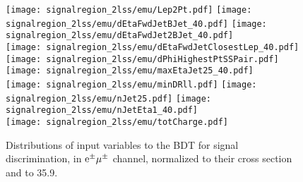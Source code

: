 \begin{figure} [!h]
  \centering
  \texttt{[image: signalregion\_2lss/emu/Lep2Pt.pdf]}
  \texttt{[image: signalregion\_2lss/emu/dEtaFwdJetBJet\_40.pdf]}
  \texttt{[image: signalregion\_2lss/emu/dEtaFwdJet2BJet\_40.pdf]}\\
  \texttt{[image: signalregion\_2lss/emu/dEtaFwdJetClosestLep\_40.pdf]} 
  \texttt{[image: signalregion\_2lss/emu/dPhiHighestPtSSPair.pdf]}
  \texttt{[image: signalregion\_2lss/emu/maxEtaJet25\_40.pdf]}\\
  \texttt{[image: signalregion\_2lss/emu/minDRll.pdf]}
  \texttt{[image: signalregion\_2lss/emu/nJet25.pdf]} 
  \texttt{[image: signalregion\_2lss/emu/nJetEta1\_40.pdf]}\\
  \texttt{[image: signalregion\_2lss/emu/totCharge.pdf]}
  \caption[Input variables to the BDT, $2lss-\emu$ channel]{Distributions of input variables to the BDT for signal discrimination, in $\textrm{e}^\pm\mu^\pm$ channel, normalized to their cross section and to 35.9\fbinv.}
  \label{fig:input_vars_2lss_xsec_emu}
\end{figure}


